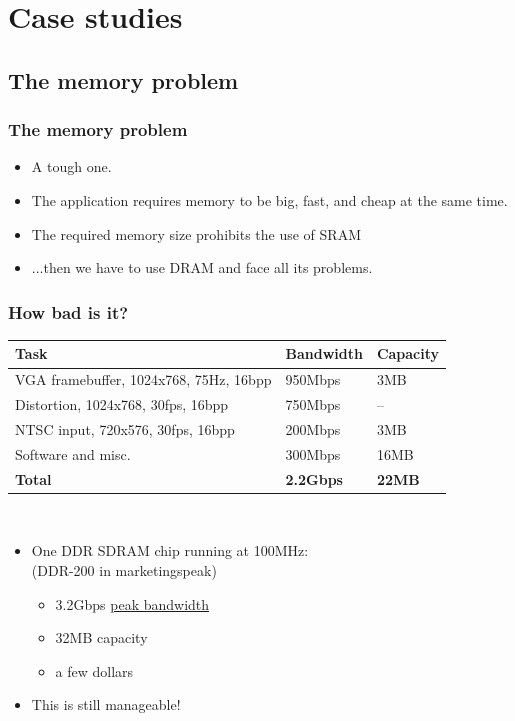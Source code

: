 \documentclass{beamer}
\begin{document}
\section{Case studies}

\subsection{The memory problem}
\frame
{
  \begin{center}
  \end{center}
}

\frame
{
  \frametitle{The memory problem}
  
  \begin{itemize}
  \item A tough one.
  \item The application requires memory to be big, fast, and cheap at the same time.
  \item The required memory size prohibits the use of SRAM
  \item ...then we have to use DRAM and face all its problems.
  \end{itemize}
}

\frame
{
  \frametitle{How bad is it?}
  
  \begin{tabular}{|l|l|l|}
  \hline
  \textbf{Task} & \textbf{Bandwidth} & \textbf{Capacity} \\
  \hline
  VGA framebuffer, 1024x768, 75Hz, 16bpp & 950Mbps & 3MB \\
  \hline
  Distortion, 1024x768, 30fps, 16bpp & 750Mbps & -- \\
  \hline
  NTSC input, 720x576, 30fps, 16bpp & 200Mbps & 3MB \\
  \hline
  Software and misc. & 300Mbps & 16MB \\
  \hline
  \textbf{Total} & \textbf{2.2Gbps} & \textbf{22MB} \\
  \hline
  \end{tabular}\\
  
  \begin{itemize}
  \item One DDR SDRAM chip running at 100MHz:\\(DDR-200 in marketingspeak)
  \begin{itemize}
  \item 3.2Gbps \underline{peak bandwidth}
  \item 32MB capacity
  \item a few dollars
  \end{itemize}
  \item This is still manageable!
  \end{itemize}
}
\end{document}
